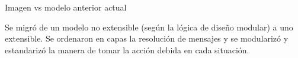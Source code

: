 Imagen vs modelo anterior actual











Se migró de un modelo no extensible (según la lógica de diseño modular) a uno extensible. Se ordenaron en capas la resolución de mensajes y se modularizó y estandarizó la manera de tomar la acción debida en cada situación.

